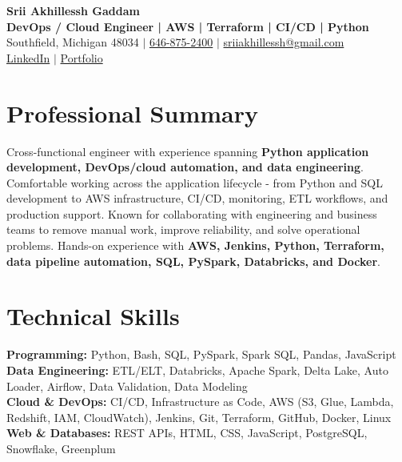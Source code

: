 \documentclass[letterpaper,10pt]{article}
\begin{document}
\fontsize{9.35pt}{10.45pt}\selectfont

\begin{center}
    {\LARGE \textbf{Srii Akhillessh Gaddam}} \\[-1pt]
    \textbf{DevOps / Cloud Engineer | AWS | Terraform | CI/CD | Python} \\[2pt]
    Southfield, Michigan 48034 $|$
    \href{tel:6468752400}{646-875-2400} $|$
    \href{mailto:sriiakhillessh@gmail.com}{sriiakhillessh@gmail.com} \\[1pt]
    \href{https://www.linkedin.com/in/srii-akhiilessh-gaddam-b48668191/}{LinkedIn} $|$
    \href{https://sriiakhillesshg.github.io/portfolio/}{Portfolio}
\end{center}
\vspace{-8pt}

\section{Professional Summary}
\small{Cross-functional engineer with experience spanning \textbf{Python application development, DevOps/cloud automation, and data engineering}. Comfortable working across the application lifecycle - from Python and SQL development to AWS infrastructure, CI/CD, monitoring, ETL workflows, and production support. Known for collaborating with engineering and business teams to remove manual work, improve reliability, and solve operational problems. Hands-on experience with \textbf{AWS, Jenkins, Python, Terraform, data pipeline automation, SQL, PySpark, Databricks, and Docker}.}

\section{Technical Skills}
\small{
\textbf{Programming:} Python, Bash, SQL, PySpark, Spark SQL, Pandas, JavaScript \\
\textbf{Data Engineering:} ETL/ELT, Databricks, Apache Spark, Delta Lake, Auto Loader, Airflow, Data Validation, Data Modeling \\
\textbf{Cloud \& DevOps:} CI/CD, Infrastructure as Code, AWS (S3, Glue, Lambda, Redshift, IAM, CloudWatch), Jenkins, Git, Terraform, GitHub, Docker, Linux \\
\textbf{Web \& Databases:} REST APIs, HTML, CSS, JavaScript, PostgreSQL, Snowflake, Greenplum
}
\end{document}
